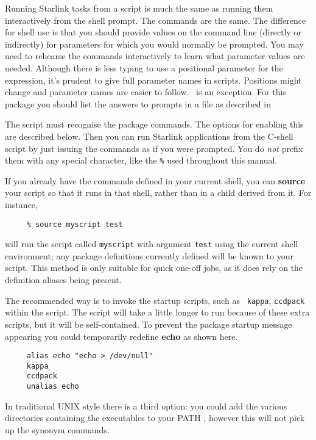 Running Starlink tasks from a script is much the same as running them
interactively from the shell prompt.  The commands are the same.  The
difference for shell use is that you should provide values on the
command line (directly or indirectly) for parameters for which you
would normally be prompted.  You may need to rehearse the commands
interactively to learn what parameter values are needed.
Although there is less typing to use a positional parameter for the
expression, it's prudent to give full parameter names in scripts.
Positions might change and parameter names are easier to follow.
\CURSAref\ is an exception.  For this package you should list the
answers to prompts in a file as described in

The script must recognise the package commands.  The options for
enabling this are described below.  Then you can run Starlink
applications from the C-shell script by just issuing the commands as if
you were prompted.  You do {\em not} prefix them with any special
character, like the {\tt \%} used throughout this manual.

If you already have the commands defined in your current shell, you
can {\bf source} your script so that it runs in that shell, rather than
in a child  derived from it.  For instance,

\small
\begin{verbatim}
     % source myscript test
\end{verbatim}
\normalsize
will run the script called {\tt myscript} with argument {\tt test} using
the current shell environment; any package definitions currently
defined will be known to your script.  This method is only suitable
for quick one-off jobs, as it does rely on the definition aliases being
present.

The recommended way is to invoke the startup scripts, such as {\tt
kappa}, {\tt ccdpack} within the script.  The script will take a
little longer to run because of these extra scripts, but it will be
self-contained.  To prevent the package startup message appearing you
could temporarily redefine {\bf echo} as shown here.

\small
\begin{verbatim}
     alias echo "echo > /dev/null"
     kappa
     ccdpack
     unalias echo
\end{verbatim}
\normalsize
In traditional UNIX style there is a third option: you could add the
various directories containing the executables to your PATH
, however this will not
pick up the synonym commands.

